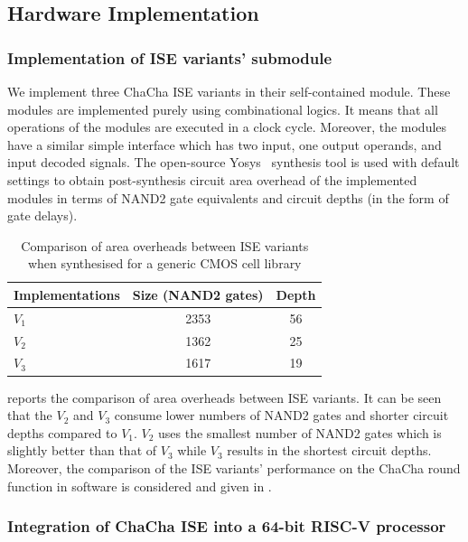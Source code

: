 \subsection{Hardware Implementation}
\subsubsection{Implementation of ISE variants' submodule}
We implement three ChaCha ISE variants in their self-contained module. 
These modules are implemented purely using combinational logics. 
It means that all operations of the modules are executed in a clock cycle. 
Moreover, the modules have a similar simple interface which has two input, one output operands, and input decoded signals.
The open-source Yosys~\cite{Yosys} synthesis tool is used with default settings to obtain post-synthesis circuit area overhead of the implemented modules in terms of NAND2 gate equivalents and circuit depths (in the form of gate delays). 
 
\begin{table}
	\caption{Comparison of area overheads between ISE variants when synthesised for a
		generic CMOS cell library}
	\centering
	\label{tab:res:hardcost1}
	\begin{tabular}{lcc}
		\toprule            
		Implementations        & Size (NAND2 gates)    & Depth  \\
		
		\midrule
		$V_1$ &     2353     & 56   \\
		$V_2$ &     1362     & 25   \\
		$V_3$ &     1617     & 19   \\
		
		\bottomrule
	\end{tabular}
\end{table}

 reports the comparison of area overheads between ISE variants. It can be seen that the $V_2$ and $V_3$ consume lower numbers of NAND2 gates and shorter circuit depths compared to $V_1$. $V_2$ uses the smallest number of NAND2 gates which is slightly better than that of $V_3$ while $V_3$ results in the shortest circuit depths. Moreover, the comparison of the ISE variants' performance on the ChaCha round function in software is considered and given in .

\subsubsection{Integration of ChaCha ISE into a 64-bit RISC-V processor}
\label{sec:ise:hw:sys}


